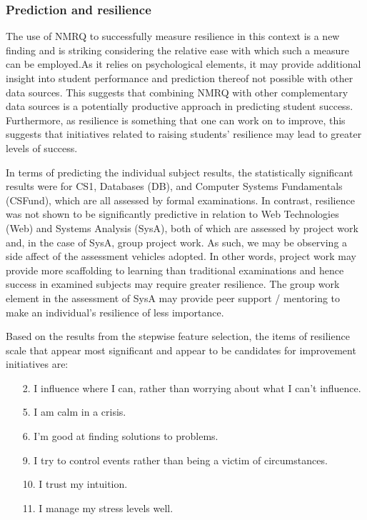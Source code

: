 \documentclass[sigconf]{acmart}
\begin{document}
\subsubsection{Prediction and resilience}

The use of NMRQ to successfully measure resilience in this context is a new finding and is striking considering the relative ease with which such a measure can be employed.As it relies on psychological elements, it may provide additional insight into student performance and prediction thereof not possible with other data sources. This suggests that combining NMRQ with other complementary data sources is a potentially productive approach in predicting student success. Furthermore, as resilience is something that one can work on to improve, this suggests that initiatives related to raising students' resilience may lead to greater levels of success. 

In terms of predicting the individual subject results, the statistically significant results were for CS1, Databases (DB), and Computer Systems Fundamentals (CSFund), which are all assessed by formal examinations. In contrast, resilience was not shown to be significantly predictive in relation to Web Technologies (Web) and Systems Analysis (SysA), both of which are assessed by project work and, in the case of SysA, group project work. As such, we may be observing a side affect of the assessment vehicles adopted. In other words, project work may provide more scaffolding to learning than traditional examinations and hence success in examined subjects may require greater resilience. The group work element in the assessment of SysA may provide peer support / mentoring to make an individual's resilience of less importance.    

Based on the results from the stepwise feature selection, the items of resilience scale that appear most significant and appear to be candidates for improvement initiatives are:
\begin{enumerate}
    \item[2. ] I influence where I can, rather than worrying about what I can't influence.
    \item[5. ] I am calm in a crisis.
    \item[6. ] I'm good at finding solutions to problems.
    \item[9. ] I try to control events rather than being a victim of circumstances.
    \item[10. ] I trust my intuition.
    \item[11. ] I manage my stress levels well.
\end{enumerate}
\end{document}
